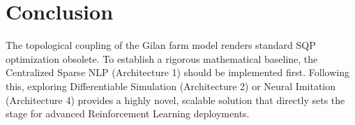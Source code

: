 \documentclass[12pt, a4paper]{article}
\begin{document}
\section{Conclusion}
\label{sec:conclusion}
The topological coupling of the Gilan farm model renders standard SQP optimization obsolete. To establish a rigorous mathematical baseline, the Centralized Sparse NLP (Architecture 1) should be implemented first. Following this, exploring Differentiable Simulation (Architecture 2) or Neural Imitation (Architecture 4) provides a highly novel, scalable solution that directly sets the stage for advanced Reinforcement Learning deployments.
\end{document}
